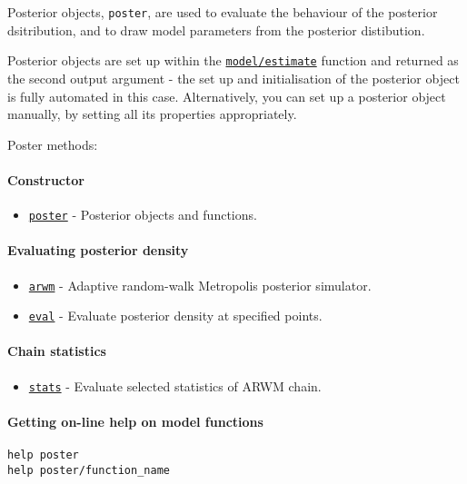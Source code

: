 

	Posterior objects, \texttt{poster}, are used to evaluate the behaviour
of the posterior dsitribution, and to draw model parameters from the
posterior distibution.

Posterior objects are set up within the
\href{model/estimate}{\texttt{model/estimate}} function and returned as
the second output argument - the set up and initialisation of the
posterior object is fully automated in this case. Alternatively, you can
set up a posterior object manually, by setting all its properties
appropriately.

Poster methods:

\paragraph{Constructor}\label{constructor}

\begin{itemize}
\itemsep1pt\parskip0pt
\item
  \href{poster/poster}{\texttt{poster}} - Posterior objects and
  functions.
\end{itemize}

\paragraph{Evaluating posterior
density}\label{evaluating-posterior-density}

\begin{itemize}
\itemsep1pt\parskip0pt
\item
  \href{poster/arwm}{\texttt{arwm}} - Adaptive random-walk Metropolis
  posterior simulator.
\item
  \href{poster/eval}{\texttt{eval}} - Evaluate posterior density at
  specified points.
\end{itemize}

\paragraph{Chain statistics}\label{chain-statistics}

\begin{itemize}
\itemsep1pt\parskip0pt
\item
  \href{poster/stats}{\texttt{stats}} - Evaluate selected statistics of
  ARWM chain.
\end{itemize}

\paragraph{Getting on-line help on model
functions}\label{getting-on-line-help-on-model-functions}

\begin{verbatim}
help poster
help poster/function_name
\end{verbatim}



